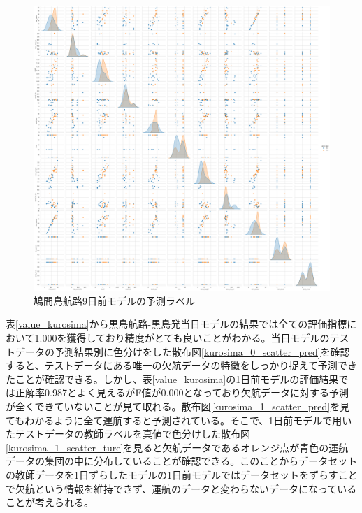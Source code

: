 \begin{figure}[H]
 \centering
 \includegraphics[keepaspectratio, scale=0.25]{fig/chapter4/hatoma_9_pred.png}
 \caption{鳩間島航路9日前モデルの予測ラベル}
 \label{hatoma_9_scatter_pred}
\end{figure}

表\ref{value_kurosima}から黒島航路-黒島発当日モデルの結果では全ての評価指標において1.000を獲得しており精度がとても良いことがわかる。当日モデルのテストデータの予測結果別に色分けをした散布図\ref{kurosima_0_scatter_pred}を確認すると、テストデータにある唯一の欠航データの特徴をしっかり捉えて予測できたことが確認できる。しかし、表\ref{value_kurosima}の1日前モデルの評価結果では正解率0.987とよく見えるがF値が0.000となっており欠航データに対する予測が全くできていないことが見て取れる。散布図\ref{kurosima_1_scatter_pred}を見てもわかるように全て運航すると予測されている。そこで、1日前モデルで用いたテストデータの教師ラベルを真値で色分けした散布図\ref{kurosima_1_scatter_ture}を見ると欠航データであるオレンジ点が青色の運航データの集団の中に分布していることが確認できる。このことからデータセットの教師データを1日ずらしたモデルの1日前モデルではデータセットをずらすことで欠航という情報を維持できず、運航のデータと変わらないデータになっていることが考えられる。


